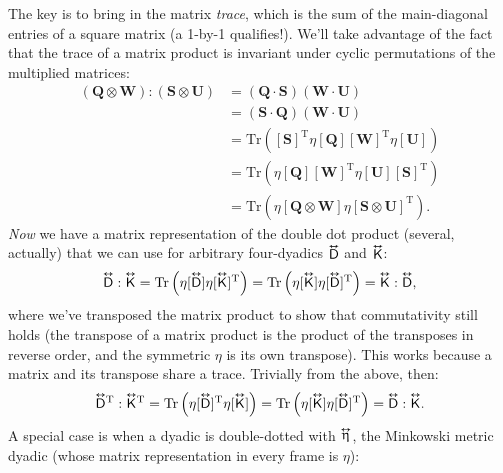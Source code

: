 \documentclass[12pt]{article}
\renewcommand{\vv}[1]{\mathbf{#1}}
\newcommand{\tightoverset}[2]{%
  \mathop{#2}\limits^{\vbox to -.5ex{\kern-0.75ex\hbox{$#1$}\vss}}}
\newcommand{\inlinedy}[1]{\tightoverset{\text{\tiny$\bm\leftrightarrow$}}{#1}}
\newcommand{\capdy}[1]{ \overset{ \text{\tiny$\bm\leftrightarrow$} }{\vphantom{\text{\small{A}}}\smash{#1}} }
\begin{document}
The key is to bring in the matrix \emph{trace}, which is the sum of the main-diagonal entries of a square matrix (a 1-by-1 qualifies!). We'll take advantage of the fact that the trace of a matrix product is invariant under cyclic permutations of the multiplied matrices:
\begin{equation*}
\begin{aligned}
(\vv Q \otimes \vv W) : (\vv S \otimes \vv U) &= (\vv Q \cdot \vv S) (\vv W \cdot \vv U) \\
&= (\vv S \cdot \vv Q) (\vv W \cdot \vv U) \\
&= \mathrm{Tr} \left( [\vv S]^{\mathrm{T}} \eta [\vv Q] [\vv W]^{\mathrm{T}} \eta [\vv U] \right) \\[2pt]
&= \mathrm{Tr} \left( \eta [\vv Q] [\vv W]^{\mathrm{T}} \eta [\vv U] [\vv S]^{\mathrm{T}} \right) \\[2pt]
&= \mathrm{Tr} \left( \eta [\vv Q \otimes \vv W] \eta [\vv S \otimes \vv U]^\mathrm{T} \right).
\end{aligned}
\end{equation*}
\emph{Now} we have a matrix representation of the double dot product (several, actually) that we can use for arbitrary four-dyadics $\inlinedy{\mathsf{D}}$ and $\inlinedy{\mathsf{K}}$:
\begin{equation}\label{eq:ddpcom}
\capdy{\mathsf{D}} : \capdy{\mathsf{K}} = \mathrm{Tr} \left( \eta [\capdy{\mathsf{D}}] \eta [ \capdy{\mathsf{K}} ]^{\mathrm{T}} \right) = \mathrm{Tr} \left( \eta [\capdy{\mathsf{K}}] \eta [ \capdy{\mathsf{D}} ]^{\mathrm{T}} \right) = \capdy{\mathsf{K}} : \capdy{\mathsf{D}} ,
\end{equation}
where we've transposed the matrix product to show that commutativity still holds (the transpose of a matrix product is the product of the transposes in reverse order, and the symmetric $\eta$ is its own transpose). This works because a matrix and its transpose share a trace. Trivially from the above, then:
\begin{equation}\label{eq:ddptrans}
\capdy{\mathsf{D}} \mkern0mu ^\mathrm{T} : \capdy{\mathsf{K}} \mkern0mu ^\mathrm{T} = \mathrm{Tr} \left( \eta [\capdy{\mathsf{D}}]^{\mathrm{T}} \eta [ \capdy{\mathsf{K}} ] \right) = \mathrm{Tr} \left( \eta [\capdy{\mathsf{K}}] \eta [ \capdy{\mathsf{D}} ]^{\mathrm{T}} \right) = \capdy{\mathsf{D}} : \capdy{\mathsf{K}} .
\end{equation}
A special case is when a dyadic is double-dotted with $\inlinedy{\upeta}$, the Minkowski metric dyadic (whose matrix representation in every frame is $\eta$):
\end{document}
